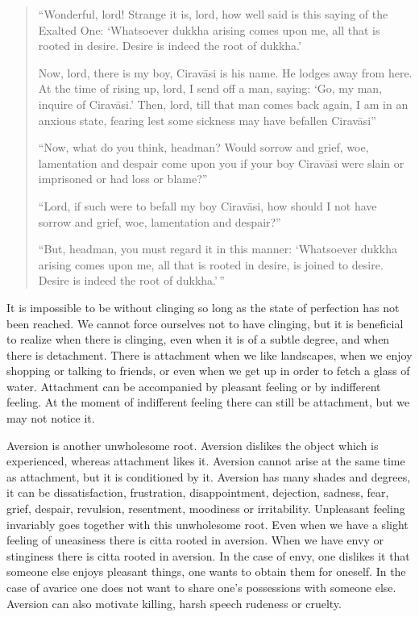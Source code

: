 \documentclass{book}
\begin{document}
\begin{quote}``Wonderful, lord! Strange it is, lord, how well said is this saying of
the Exalted One: `Whatsoever dukkha arising comes upon me, all that is
rooted in desire. Desire is indeed the root of dukkha.'

Now, lord, there is my boy, Ciravāsi is his name. He lodges away from
here. At the time of rising up, lord, I send off a man, saying: `Go, my
man, inquire of Ciravāsi.' Then, lord, till that man comes back again, I
am in an anxious state, fearing lest some sickness may have befallen
Ciravāsi''

``Now, what do you think, headman? Would sorrow and grief, woe,
lamentation and despair come upon you if your boy Ciravāsi were slain or
imprisoned or had loss or blame?''

``Lord, if such were to befall my boy Ciravāsi, how should I not have
sorrow and grief, woe, lamentation and despair?''

``But, headman, you must regard it in this manner: `Whatsoever dukkha
arising comes upon me, all that is rooted in desire, is joined to
desire. Desire is indeed the root of dukkha.'\,''
\end{quote}

It is impossible to be without clinging so long as the state of
perfection has not been reached. We cannot force ourselves not to have
clinging, but it is beneficial to realize when there is clinging, even
when it is of a subtle degree, and when there is detachment. There is
attachment when we like landscapes, when we enjoy shopping or talking to
friends, or even when we get up in order to fetch a glass of water.
Attachment can be accompanied by pleasant feeling or by indifferent
feeling. At the moment of indifferent feeling there can still be
attachment, but we may not notice it.

Aversion is another unwholesome root. Aversion dislikes the object which
is experienced, whereas attachment likes it. Aversion cannot arise at
the same time as attachment, but it is conditioned by it. Aversion has
many shades and degrees, it can be dissatisfaction, frustration,
disappoint­ment, dejection, sadness, fear, grief, despair, revulsion,
resentment, moodiness or irritability. Unpleasant feeling invariably
goes together with this unwholesome root. Even when we have a slight
feeling of uneasiness there is citta rooted in aversion. When we have
envy or stinginess there is citta rooted in aversion. In the case of
envy, one dislikes it that someone else enjoys pleasant things, one
wants to obtain them for oneself. In the case of avarice one does not
want to share one's possessions with someone else. Aversion can also
motivate killing, harsh speech rudeness or cruelty.
\end{document}
